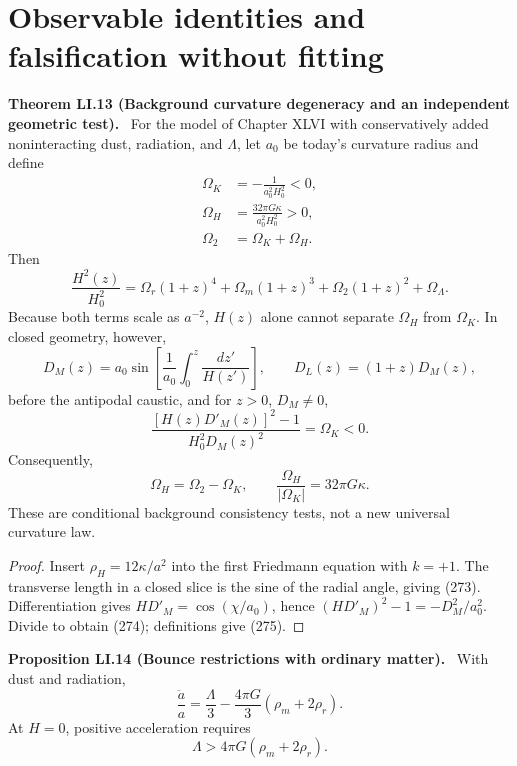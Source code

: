 \documentclass[11pt,a4paper,oneside]{book}
\newcommand{\statement}[3]{\par\medskip\noindent\textbf{#1 #2 (#3).}\ }
\begin{document}
\section{Observable identities and falsification without fitting}
\statement{Theorem}{LI.13}{Background curvature degeneracy and an independent geometric test}
For the model of Chapter XLVI with conservatively added noninteracting dust, radiation, and $\Lambda$, let $a_0$ be today's curvature radius and define
\begin{align}\Omega_K&=-\frac1{a_0^2H_0^2}<0,\tag{269}\\\Omega_H&=\frac{32\pi G\kappa}{a_0^2H_0^2}>0,\tag{270}\\\Omega_2&=\Omega_K+\Omega_H.\tag{271}\end{align}
Then
\begin{equation}\frac{H^2(z)}{H_0^2}=\Omega_r(1+z)^4+\Omega_m(1+z)^3+\Omega_2(1+z)^2+\Omega_\Lambda.\tag{272}\end{equation}
Because both terms scale as $a^{-2}$, $H(z)$ alone cannot separate $\Omega_H$ from $\Omega_K$. In closed geometry, however,
\begin{equation}D_M(z)=a_0\sin\left[\frac1{a_0}\int_0^z\frac{dz'}{H(z')}\right],\qquad D_L(z)=(1+z)D_M(z),\tag{273}\end{equation}
before the antipodal caustic, and for $z>0$, $D_M\ne0$,
\begin{equation}\frac{[H(z)D'_M(z)]^2-1}{H_0^2D_M(z)^2}=\Omega_K<0.\tag{274}\end{equation}
Consequently,
\begin{equation}\Omega_H=\Omega_2-\Omega_K,\qquad\frac{\Omega_H}{|\Omega_K|}=32\pi G\kappa.\tag{275}\end{equation}
These are conditional background consistency tests, not a new universal curvature law.
\begin{proof}
Insert $\rho_H=12\kappa/a^2$ into the first Friedmann equation with $k=+1$. The transverse length in a closed slice is the sine of the radial angle, giving (273). Differentiation gives $HD'_M=\cos(\chi/a_0)$, hence $(HD'_M)^2-1=-D_M^2/a_0^2$. Divide to obtain (274); definitions give (275).
\end{proof}
\statement{Proposition}{LI.14}{Bounce restrictions with ordinary matter}
With dust and radiation,
\begin{equation}\frac{\ddot a}a=\frac\Lambda3-\frac{4\pi G}3(\rho_m+2\rho_r).\tag{276}\end{equation}
At $H=0$, positive acceleration requires
\begin{equation}\Lambda>4\pi G(\rho_m+2\rho_r).\tag{277}\end{equation}
\end{document}
